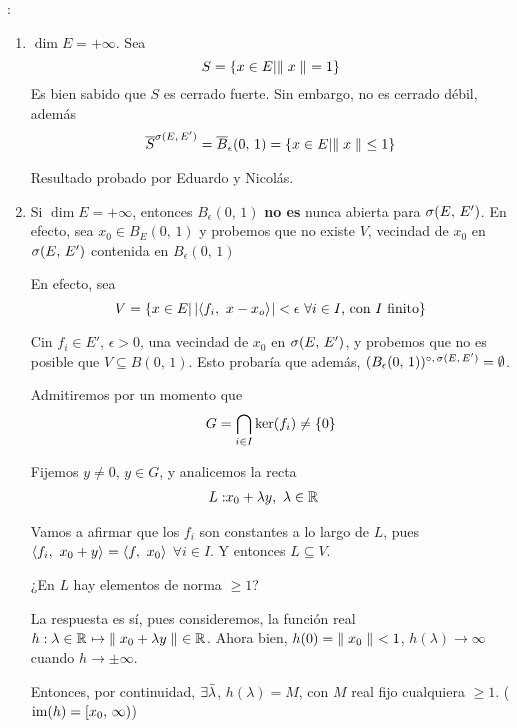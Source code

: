 \begin{ex}:\\
\begin{enumerate}
    \item $\dim E = + \infty$. Sea
    \begin{equation*}
        S = \conj{
        x \in E | \norm[]{x} = 1
        }
    \end{equation*}
    Es bien sabido que $S$ es cerrado fuerte. Sin embargo, no es cerrado débil, además
    \begin{equation*}
        \overline{S}^{\topdebilE} = \overline{B}_{\epsilon}(0,\, 1)= \conj{
        x \in E| \norm[]{x} \leq 1
        }
    \end{equation*}
    
    Resultado probado por Eduardo y Nicolás.
    
    \item Si $\dim E = + \infty$, entonces $B_{\epsilon} (0,\, 1)$ \textbf{no es} nunca abierta para $\topdebilE$. En efecto, sea $x_0 \in B_{E}(0,\, 1)$ y probemos que no existe $V$, vecindad de $x_0$ en $\topdebilE$ contenida en $B_{\epsilon} (0,\, 1)$
    
    En efecto, sea
    \begin{equation*}
        V = \conj{
        x \in E | \abs{\prodint[]{f_i}{x-x_o}} < \epsilon \ \forall i \in I \text{, con $I$ finito}
        }
    \end{equation*}
    
    Cin $f_i \in E'$, $\epsilon > 0$, una vecindad de $x_0$ en $\topdebilE$, y probemos que no es posible que $V \subseteq B(0,\, 1)$. Esto probaría que además, $(B_\epsilon(0,\, 1))^{\circ,\, \topdebilE} = \emptyset$.
    
    Admitiremos por un momento que 
    \begin{equation*}
        G = \bigcap_{i\in I} \ker(f_i) \not = \conj{0}
    \end{equation*}
    
    Fijemos $y \not = 0$, $y \in G$, y analicemos la recta 
    \begin{eqnarray}
    L:& x_0 + \lambda y,\ \lambda \in \rr
    \end{eqnarray}
    
    Vamos a afirmar que los $f_i$ son constantes a lo largo de $L$, pues $\prodint[]{f_i}{x_0 + y} = \prodint[]{f}{x_0}$ $\forall i \in I$. Y entonces $L \subseteq V$.
    
    ¿En $L$ hay elementos de norma $\geq 1$?
    
    La respuesta es sí, pues consideremos, la función real $h: \lambda \in \rr \mapsto \norm[]{x_0 + \lambda y} \in \rr$. Ahora bien, $h(0) = \norm[]{x_0} < 1$, $h(\lambda) \to \infty$ cuando $h \to \pm \infty$.
    
    Entonces, por continuidad, $\exists \Bar{\lambda}$, $h(\lambda) = M$, con $M$ real fijo cualquiera $\geq 1$. ($\im(h) = [x_0,\, \infty)$)
    
\end{enumerate}
\end{ex}


